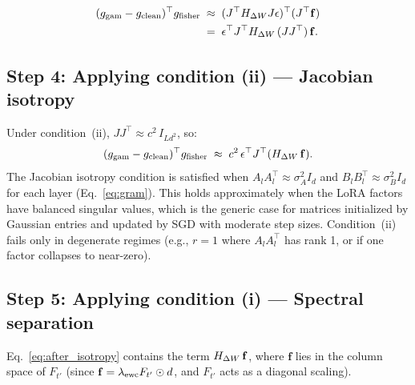 \begin{align}
  (g_{\mathrm{gam}}-g_{\mathrm{clean}})^\top g_{\mathrm{fisher}}
  &\;\approx\; (J^\top H_{\Delta W} J\epsilon)^\top (J^\top\mathbf{f}) \notag\\
  &\;=\; \epsilon^\top J^\top H_{\Delta W}\,(JJ^\top)\,\mathbf{f}.
  \label{eq:inner_product}
\end{align}

\subsection*{Step 4: Applying condition (ii) — Jacobian isotropy}

Under condition~(ii), $JJ^\top \approx c^2\,I_{Ld^2}$, so:
\begin{equation}
  (g_{\mathrm{gam}}-g_{\mathrm{clean}})^\top g_{\mathrm{fisher}}
  \;\approx\; c^2\,\epsilon^\top J^\top (H_{\Delta W}\,\mathbf{f}).
  \label{eq:after_isotropy}
\end{equation}
The Jacobian isotropy condition is satisfied when
$A_lA_l^\top\approx \sigma_A^2 I_d$ and $B_lB_l^\top\approx \sigma_B^2 I_d$
for each layer (Eq.~\eqref{eq:gram}).
This holds approximately when the LoRA factors have balanced singular values,
which is the generic case for matrices initialized by Gaussian entries and updated by SGD
with moderate step sizes.
Condition~(ii) fails only in degenerate regimes
(e.g., $r=1$ where $A_lA_l^\top$ has rank 1,
or if one factor collapses to near-zero).

\subsection*{Step 5: Applying condition (i) — Spectral separation}

Eq.~\eqref{eq:after_isotropy} contains the term $H_{\Delta W}\,\mathbf{f}$,
where $\mathbf{f}$ lies in the column space of $F_{t'}$ (since $\mathbf{f} = \lambda_{\mathrm{ewc}} F_{t'}\odot d$,
and $F_{t'}$ acts as a diagonal scaling).

